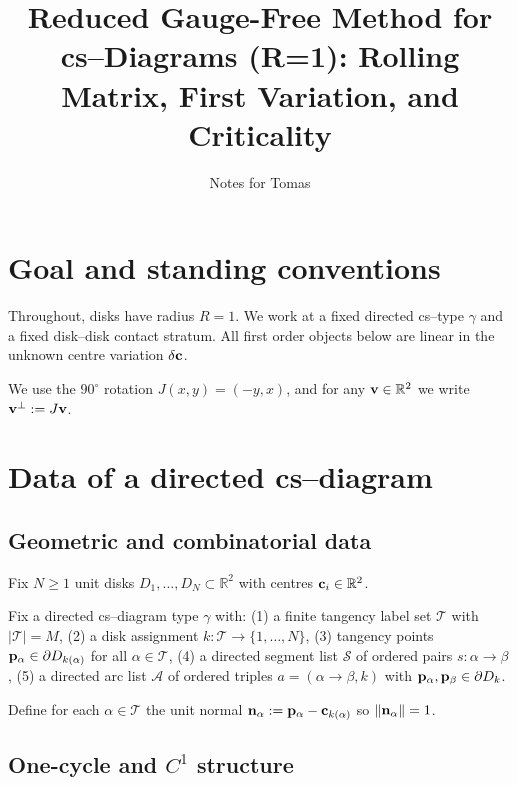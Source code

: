 \documentclass[12pt,letterpaper]{amsart}
\theoremstyle{definition}
\theoremstyle{remark}
\newcommand{\R}{{\mathbb{R}}}
\begin{document}
\title{Reduced Gauge-Free Method for cs--Diagrams (R=1): Rolling Matrix, First Variation, and Criticality}
\author{Notes for Tomas}
\date{}
\maketitle

\section{Goal and standing conventions}

Throughout, disks have radius $R=1$.
We work at a fixed directed cs--type $\gamma$ and a fixed disk--disk contact stratum.
All first order objects below are linear in the unknown centre variation $\delta{\bf c}$.

We use the $90^\circ$ rotation $J(x,y)=(-y,x)$, and for any ${\bf v}\in\R^2$ we write ${\bf v}^\perp:=J{\bf v}$.

\section{Data of a directed cs--diagram}

\subsection{Geometric and combinatorial data}

Fix $N\ge 1$ unit disks $D_1,\dots,D_N\subset\R^2$ with centres ${\bf c}_i\in\R^2$.

Fix a directed cs--diagram type $\gamma$ with:
(1) a finite tangency label set $\mathcal T$ with $|\mathcal T|=M$,
(2) a disk assignment $k:\mathcal T\to\{1,\dots,N\}$,
(3) tangency points ${\bf p}_\alpha\in\partial D_{k(\alpha)}$ for all $\alpha\in\mathcal T$,
(4) a directed segment list $\mathcal S$ of ordered pairs $s:\alpha\to\beta$,
(5) a directed arc list $\mathcal A$ of ordered triples $a=(\alpha\to\beta,k)$ with ${\bf p}_\alpha,{\bf p}_\beta\in\partial D_k$.

Define for each $\alpha\in\mathcal T$ the unit normal ${\bf n}_\alpha:={\bf p}_\alpha-{\bf c}_{k(\alpha)}$ so $\|{\bf n}_\alpha\|=1$.

\subsection{One-cycle and $C^1$ structure}
\end{document}
